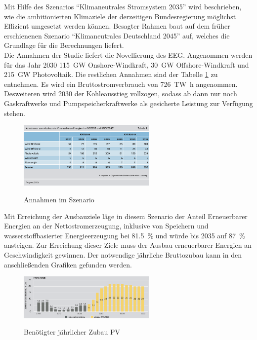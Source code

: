 		Mit Hilfe des Szenarios "`Klimaneutrales Stromsystem 2035"' wird beschrieben, wie die ambitionierten Klimaziele der derzeitigen Bundesregierung möglichst Effizient umgesetzt werden können. Besagter Rahmen baut auf dem früher erschienenen Szenario "`Klimaneutrales Deutschland 2045"' auf, welches die Grundlage für die Berechnungen liefert.\\
		Die Annahmen der Studie liefert die Novellierung des EEG. Angenommen werden für das Jahr 2030 \SI{115}{\giga \watt} Onshore-Windkraft, \SI{30}{\giga \watt} Offshore-Windkraft und \SI{215}{\giga \watt} Photovoltaik.\cite[S.22]{Agora_KlimaneutralesStromsystem} Die restlichen Annahmen sind der Tabelle \ref{Abb. Annahmen Agora2035} zu entnehmen.	Es wird ein Bruttostromverbrauch von \SI{726}{\tera \watt \hour} angenommen.\cite[S.33]{Agora_KlimaneutralesStromsystem} Desweiteren wird 2030 der Kohleausstieg vollzogen, sodass ab dann nur noch Gaskraftwerke und Pumpspeicherkraftwerke als gesicherte Leistung zur Verfügung stehen.\cite[S.31]{Agora_KlimaneutralesStromsystem} \\
		
		\begin{figure}[H]
			\centering
			\includegraphics[page=1, width=0.6\textwidth]{./anhang/Annahmen Agora2035.png}
			\caption{Annahmen im Szenario}
			\label{Abb. Annahmen Agora2035} \cite[S.22]{Agora_KlimaneutralesStromsystem}
		\end{figure}
	
		Mit Erreichung der Ausbauziele läge in diesem Szenario der Anteil Erneuerbarer Energien an der Nettostromerzeugung, inklusive von Speichern und wasserstoffbasierter Energieerzeugung bei \SI{81,5}{\percent} und würde bis 2035 auf \SI{87}{\percent} ansteigen. \cite[S.23]{Agora_KlimaneutralesStromsystem} Zur Erreichung dieser Ziele muss der Ausbau erneuerbarer Energien an Geschwindigkeit gewinnen. Der notwendige jährliche Bruttozubau kann in den anschließenden Grafiken gefunden werden. \\
			
			\begin{figure}[H]
				\centering
				\includegraphics[page=1, clip, width=0.6\textwidth]{./anhang/Zubau PV Agora2035.png}
				\caption{Benötigter jährlicher Zubau PV}
				\label{Abb.Zubau PV Agora2035} \cite[S.24]{Agora_KlimaneutralesStromsystem}
			\end{figure}
			
